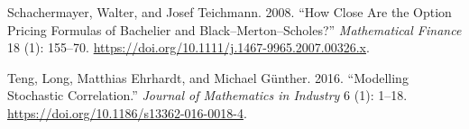 \documentclass[
  english,
  10pt,
  letterpaper,
  DIV=11,
  numbers=noendperiod]{scrartcl}
\newlength{\cslhangindent}
\newenvironment{CSLReferences}[2] %
 {\begin{list}{}{%
  \setlength{\itemindent}{0pt}
  \setlength{\leftmargin}{0pt}
  \setlength{\parsep}{0pt}
  \ifodd #1
   \setlength{\leftmargin}{\cslhangindent}
   \setlength{\itemindent}{-1\cslhangindent}
  \fi
  \setlength{\itemsep}{#2\baselineskip}}}
 {\end{list}}
\theoremstyle{plain}
\theoremstyle{plain}
\theoremstyle{plain}
\theoremstyle{plain}
\theoremstyle{definition}
\theoremstyle{remark}
\begin{document}
\begin{CSLReferences}{1}{1}
Schachermayer, Walter, and Josef Teichmann. 2008. {``How Close Are the
Option Pricing Formulas of {Bachelier} and {Black--Merton--Scholes}?''}
\emph{Mathematical Finance} 18 (1): 155--70.
\url{https://doi.org/10.1111/j.1467-9965.2007.00326.x}.

Teng, Long, Matthias Ehrhardt, and Michael Günther. 2016. {``Modelling
Stochastic Correlation.''} \emph{Journal of Mathematics in Industry} 6
(1): 1--18. \url{https://doi.org/10.1186/s13362-016-0018-4}.

\end{CSLReferences}
\end{document}
